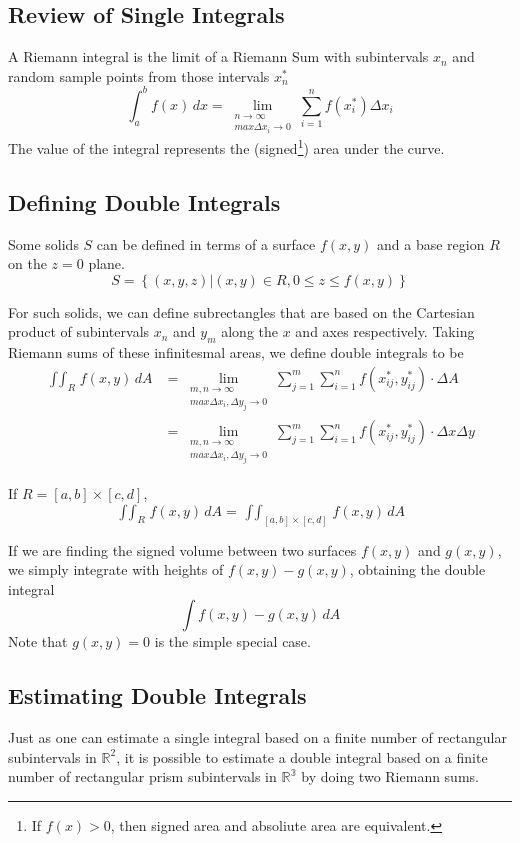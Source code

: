 \documentclass{article}
\begin{document}
\subsection{Review of Single Integrals}
A Riemann integral is the limit of a Riemann Sum with subintervals $x_n$ and random sample points from those intervals $x_n^*$
$$\int_a^bf(x)\,dx=\lim_{\substack{n\to\infty\\max\Delta{x_i}\to0}}\sum^n_{i=1}f(x_i^*)\Delta{x_i}$$
The value of the integral represents the (signed\footnote{If $f(x)>0$, then signed area and absoliute area are equivalent.}) area under the curve.

\subsection{Defining Double Integrals}
Some solids $S$ can be defined in terms of a surface $f(x,y)$ and a base region $R$ on the $z=0$ plane.
$$S=\left\{(x,y,z)|(x,y)\in R, 0\le z\le f(x,y)\right\}$$

For such solids, we can define subrectangles that are based on the Cartesian product of subintervals $x_n$ and $y_m$ along the $x$ and axes respectively. Taking Riemann sums of these infinitesmal areas, we define double integrals to be
\begin{align*}
    \mathop{\int\int}_Rf(x,y)\,dA
        &=\lim_{\substack{m,n\to\infty\\max\Delta{x_i},\Delta{y_j}\to0}}\sum_{j=1}^m\sum_{i=1}^nf(x_{ij}^*,y_{ij}^*)\cdot\Delta A\\
        &=\lim_{\substack{m,n\to\infty\\max\Delta{x_i},\Delta{y_j}\to0}}\sum_{j=1}^m\sum_{i=1}^nf(x_{ij}^*,y_{ij}^*)\cdot\Delta x\Delta y
\end{align*}

If $R=[a,b]\times[c,d]$, $$\mathop{\int\int}_Rf(x,y)\,dA=\mathop{\int\int}_{[a,b]\times[c,d]}f(x,y)\,dA$$

If we are finding the signed volume between two surfaces $f(x,y)$ and $g(x,y)$, we simply integrate with heights of $f(x,y)-g(x,y)$, obtaining the double integral $$\mathop{\int\int_R}f(x,y)-g(x,y)\,dA$$ Note that $g(x,y)=0$ is the simple special case.

\subsection{Estimating Double Integrals}
Just as one can estimate a single integral based on a finite number of rectangular subintervals in $\mathbb{R}^2$, it is possible to estimate a double integral based on a finite number of rectangular prism subintervals in $\mathbb{R^3}$ by doing two Riemann sums.
\end{document}
